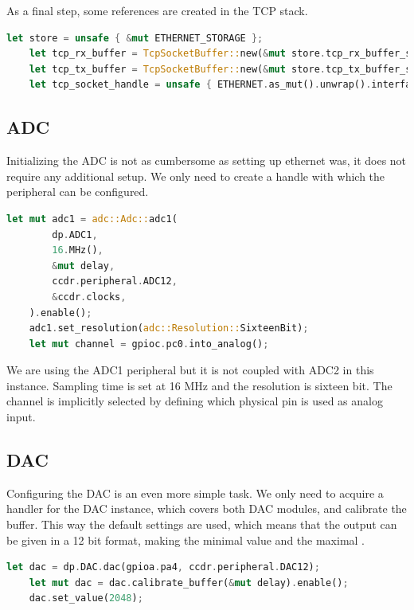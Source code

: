 As a final step, some references are created in the TCP stack.

\begin{lstlisting}[language=Rust,frame=single,float=!ht,style=customrust,label={lst:tcp-init},caption={Creating References for TCP Objects}]
    let store = unsafe { &mut ETHERNET_STORAGE };
    let tcp_rx_buffer = TcpSocketBuffer::new(&mut store.tcp_rx_buffer_storage[..]);
    let tcp_tx_buffer = TcpSocketBuffer::new(&mut store.tcp_tx_buffer_storage[..]);
    let tcp_socket_handle = unsafe { ETHERNET.as_mut().unwrap().interface.add_socket(TcpSocket::new(tcp_rx_buffer, tcp_tx_buffer)) };
\end{lstlisting}

\subsection{ADC}

Initializing the ADC is not as cumbersome as setting up ethernet was, it does not require any additional setup. We only need to create a handle with which the peripheral can be configured.

\begin{lstlisting}[language=Rust,frame=single,float=!ht,style=customrust,label={lst:adc-init},caption={Initialization of the ADC}]
    let mut adc1 = adc::Adc::adc1(
        dp.ADC1,
        16.MHz(),
        &mut delay,
        ccdr.peripheral.ADC12,
        &ccdr.clocks,
    ).enable();
    adc1.set_resolution(adc::Resolution::SixteenBit);
    let mut channel = gpioc.pc0.into_analog();
\end{lstlisting}

We are using the ADC1 peripheral but it is not coupled with ADC2 in this instance. Sampling time is set at 16 MHz and the resolution is sixteen bit. The channel is implicitly selected by defining which physical pin is used as analog input.

\subsection{DAC}

Configuring the DAC is an even more simple task. We only need to acquire a handler for the DAC instance, which covers both DAC modules, and calibrate the buffer. This way the default settings are used, which means that the output can be given in a 12 bit format, making the minimal value  and the maximal .

\begin{lstlisting}[language=Rust,frame=single,float=!ht,style=customrust,label={lst:dac-init},caption={Initialization of the DAC}]
    let dac = dp.DAC.dac(gpioa.pa4, ccdr.peripheral.DAC12);
    let mut dac = dac.calibrate_buffer(&mut delay).enable();
    dac.set_value(2048);
\end{lstlisting}

